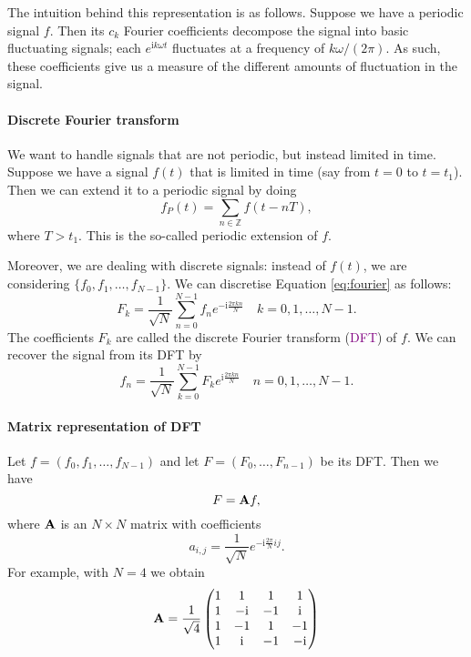 \documentclass[a4paper, 11pt, openany]{book}
\numberwithin{equation}{section}
\theoremstyle{plain}
\theoremstyle{definition}
\newcommand{\Z}{\mathbb{Z}}
\renewcommand{\i}{\mathrm{i}}
\newcommand{\Define}[1]{\textcolor{purple}{#1}}
\begin{document}
The intuition behind this representation is as follows. Suppose we have a periodic signal $f$. Then its $c_k$ Fourier coefficients decompose the signal into basic fluctuating signals; each $e^{\i k \omega t}$ fluctuates at a frequency of $k \omega/(2 \pi)$. As such, these coefficients give us a measure of the different amounts of fluctuation in the signal.

\paragraph{Discrete Fourier transform}
We want to handle signals that are not periodic, but instead limited in time. Suppose we have a signal $f(t)$ that is limited in time (say from $t=0$ to $t = t_1$). Then we can extend it to a periodic signal by doing
\[
    f_P(t) = \sum_{n \in \Z} f(t - nT),
\]
where $T > t_1$. This is the so-called periodic extension of $f$.

Moreover, we are dealing with discrete signals: instead of $f(t)$, we are considering $\{f_0, f_1, \dots, f_{N-1} \}$. We can discretise Equation \eqref{eq:fourier} as follows:
\[
    F_k = \frac{1}{\sqrt{N}} \sum_{n=0}^{N-1}  f_n e^{-\i \frac{2 \pi k n }{N}} \quad k = 0, 1, \dots, N-1.
\]
The coefficients $F_k$ are called the discrete Fourier transform (\Define{DFT}) of $f$. We can recover the signal from its DFT by
\[
    f_n = \frac{1}{\sqrt{N}} \sum_{k=0}^{N-1} F_k e^{\i \frac{2 \pi k n }{N}} \quad n = 0, 1, \dots, N-1.
\]

\paragraph{Matrix representation of DFT}
Let $f = (f_0, f_1, \dots, f_{N-1})$ and let $F = (F_0, \dots, F_{n-1})$ be its DFT. Then we have
\[
    F = {\bf A} f,
\]
where ${\bf A}$ is an $N \times N$ matrix with coefficients 
\[
    a_{i,j} = \frac{1}{\sqrt{N}} e^{- \i \frac{2\pi}{N} ij}.
\]
For example, with $N = 4$ we obtain
\[
    {\bf A} = \frac{1}{\sqrt{4}} \begin{pmatrix}
    1 & 1 & 1 & 1\\
    1 & -\i & -1 & \i\\
    1 & -1 & 1 & -1\\
    1 & \i & -1 & -\i
    \end{pmatrix}
\]
\end{document}
